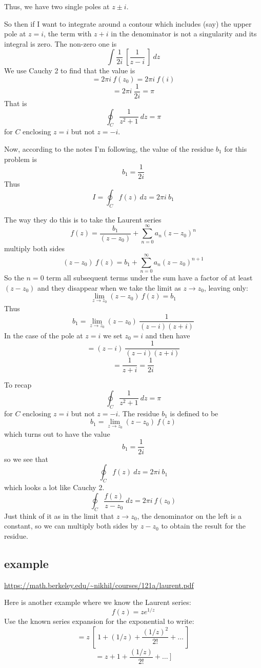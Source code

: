 \documentclass[11pt, oneside]{article}
\begin{document}
Thus, we have two single poles at $z \pm i$.  

So then if I want to integrate around a contour which includes (say) the upper pole at $z = i$, the term with $z + i$ in the denominator is not a singularity and its integral is zero.  The non-zero one is
\[ \int \frac{1}{2i} \ [ \frac{1}{z - i} \ ] \ dz \]
We use Cauchy 2 to find that the value is
\[ = 2 \pi i \ f(z_0) =  2 \pi i \ f(i) \]
\[ = 2 \pi i \ \frac{1}{2i} = \pi \]
That is
\[  \oint_C \frac{1}{z^2 + 1} \ dz = \pi \]
for $C$ enclosing $z=i$ but not $z = -i$.

Now, according to the notes I'm following, the value of the residue $b_1$ for this problem is 
\[ b_1 = \frac{1}{2i} \]
Thus
\[ I = \oint_C f(z) \ dz = 2 \pi i \ b_1 \]

The way they do this is to take the Laurent series
\[ f(z) = \frac{b_1}{(z-z_0)} + \sum_{n=0}^{\infty} a_n (z-z_0)^n \]
multiply both sides
\[ (z-z_0) \ f(z) = b_1 + \sum_{n=0}^{\infty} a_n (z-z_0)^{n+1} \]
So the $n=0$ term all subsequent terms under the sum have a factor of at least $(z - z_0)$ and they disappear when we take the limit as $z \rightarrow z_0$, leaving only:
\[ \lim_{z \rightarrow z_0} (z-z_0) \ f(z) = b_1 \]
Thus
\[ b_1 = \lim_{z \rightarrow z_0} (z-z_0) \ \frac{1}{(z - i)(z + i)} \]
In the case of the pole at $z = i$ we set $z_0 = i$ and then have
\[ = (z-i) \ \frac{1}{(z - i)(z + i)} \]
\[ = \frac{1}{z + i} = \frac{1}{2i} \]

To recap
\[  \oint_C \frac{1}{z^2 + 1} \ dz = \pi \]
for $C$ enclosing $z=i$ but not $z = -i$.
The residue $b_1$ is defined to be
\[ b_1 = \lim_{z \rightarrow z_0} (z-z_0) \ f(z)  \]
which turns out to have the value
\[ b_1 = \frac{1}{2i} \]
so we see that 
\[ \oint_C f(z) \ dz = 2 \pi i \ b_1 \]
which looks a lot like Cauchy 2.
\[ \oint_C \frac{f(z)}{z - z_0} \ dz = 2 \pi i \ f(z_0) \]
Just think of it as in the limit that $z \rightarrow z_0$, the denominator on the left is a constant, so we can multiply both sides by $z - z_0$ to obtain the result for the residue.

\subsection*{example}
\url{https://math.berkeley.edu/~nikhil/courses/121a/laurent.pdf}

Here is another example where we know the Laurent series:
\[ f(z) = z e^{1/z} \]
Use the known series expansion for the exponential to write:
\[ = z \ [ \ 1 + (1/z) + \frac{(1/z)^2}{2!} + \dots \ ] \]
\[ = z + 1 + \frac{(1/z)}{2!} + \dots \ ] \]
\end{document}
